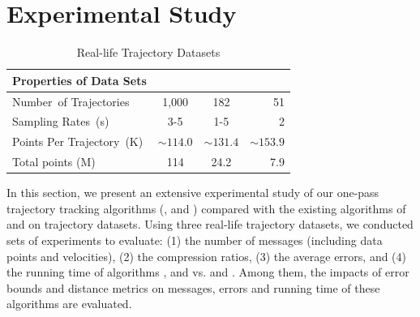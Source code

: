 \section{Experimental Study}
\label{sec-exp}


\begin{table}[!ht]
	\renewcommand{\arraystretch}{1.20}
	\caption{\small Real-life Trajectory Datasets}
	\vspace{-1.5ex}
	\centering
	\footnotesize
	\begin{tabular}{|l|c|c|r|}
		\hline
		\bf{ Properties of Data Sets} & \sercar      &\geolife   &\mopsi \\
		\hline
		{Number\ of Trajectories}	&1,000	    &182	    & 51  \\
		\hline
		 {Sampling Rates\ (s)} &3-5  & 1-5 & 2 \\
		\hline
		{Points Per Trajectory\ (K)}  &	$\sim114.0$    &$\sim131.4$	    & $\sim153.9$ \\
		\hline
		 {Total points (M)} &114   	    	&24.2    &7.9\\
		\hline
	\end{tabular}
	\label{tab:datasets}
	\vspace{-2ex}
\end{table}


In this section, we present an extensive experimental study of our one-pass trajectory tracking algorithms (\citt, \sitt and \bitt) compared with the
existing algorithms of \ldrh and \grts on trajectory datasets. Using three real-life trajectory datasets, we conducted sets of experiments to evaluate:
(1) the number of messages (including data points and velocities),
(2) the compression ratios,
(3) the average errors, and
(4) the running time of algorithms \citt, \sitt and \bitt vs. \ldrh and \grts. 
Among them, the impacts of error bounds and distance metrics on messages, errors and running time of these algorithms are evaluated. 

